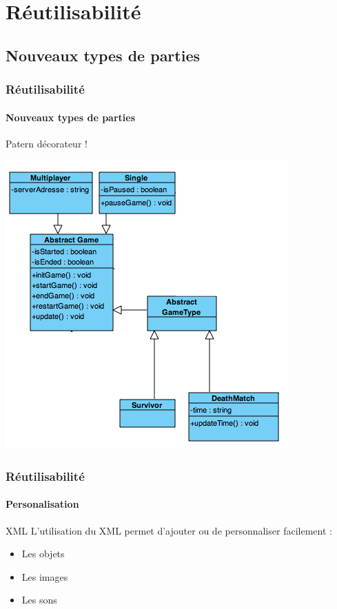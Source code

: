 \section{Réutilisabilité}
\subsection{Nouveaux types de parties}

	\begin{frame}
	\frametitle{Réutilisabilité}
	\framesubtitle{Nouveaux types de parties}
	
		Patern décorateur ! \\
		\begin{center} \includegraphics[scale=0.6]{img/decorateur.png} \end{center}
	
	\end{frame}
	

	\begin{frame}
	\frametitle{Réutilisabilité}
	\framesubtitle{Personalisation}
	
		\begin{block}{XML}
			L'utilisation du XML permet d'ajouter ou de personnaliser facilement :
			\begin{itemize}
				\item Les objets
				\item Les images
				\item Les sons
			\end{itemize}
		\end{block}
	
	\end{frame}